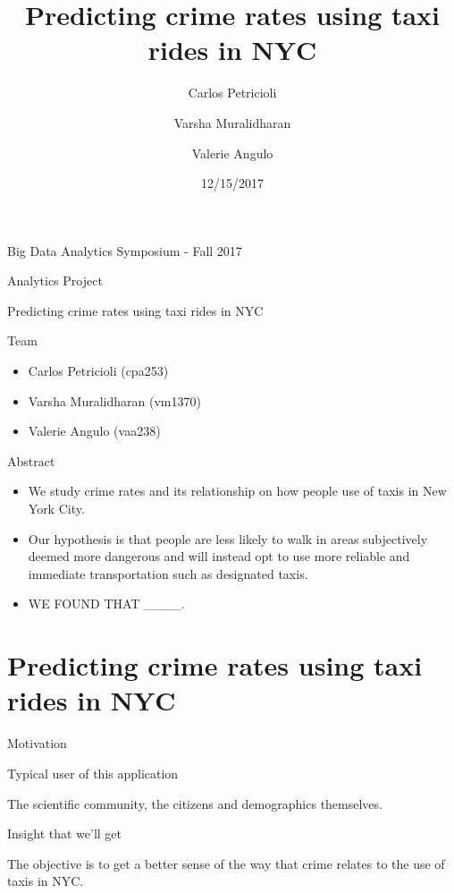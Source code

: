 \documentclass[10pt,ignorenonframetext,]{beamer}
\author{Carlos Petricioli \and
    Varsha Muralidharan   \and
    Valerie Angulo  }
\institute[New York University]{ New York University \\ \{cpa253,vm1370,vaa238\}@nyu.edu }
\title{Predicting crime rates using taxi rides in NYC}
\date{12/15/2017}
\providecommand{\tightlist}{%
  \setlength{\itemsep}{0pt}\setlength{\parskip}{0pt}}
\begin{document}
\frame{\titlepage}

\begin{frame}{%
\protect\hypertarget{big-data-analytics-symposium---fall-2017}{%
Big Data Analytics Symposium - Fall 2017}}

\begin{block}{Analytics Project}

Predicting crime rates using taxi rides in NYC

\end{block}

\begin{block}{Team}

\begin{itemize}
\item
  Carlos Petricioli (cpa253)
\item
  Varsha Muralidharan (vm1370)
\item
  Valerie Angulo (vaa238)
\end{itemize}

\end{block}

\begin{block}{Abstract}

\begin{itemize}
\tightlist
\item
  We study crime rates and its relationship on how people use of taxis
  in New York City.
\item
  Our hypothesis is that people are less likely to walk in areas
  subjectively deemed more dangerous and will instead opt to use more
  reliable and immediate transportation such as designated taxis.
\item
  WE FOUND THAT \_\_\_\_.
\end{itemize}

\end{block}

\end{frame}

\hypertarget{predicting-crime-rates-using-taxi-rides-in-nyc}{%
\section{Predicting crime rates using taxi rides in
NYC}\label{predicting-crime-rates-using-taxi-rides-in-nyc}}

\begin{frame}{%
\protect\hypertarget{motivation}{%
Motivation}}

\begin{block}{Typical user of this application}

The scientific community, the citizens and demographics themselves.

\end{block}

\begin{block}{Insight that we’ll get}

The objective is to get a better sense of the way that crime relates to
the use of taxis in NYC.

\end{block}

\end{frame}
\end{document}
